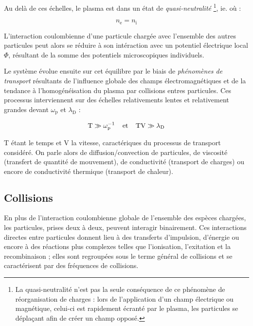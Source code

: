 \begin{refsection}
Au delà de ces échelles, le plasma est dans un état de \emph{quasi-neutralité}
\footnote{La quasi-neutralité n'est pas la seule conséquence de ce phénomène de réorganisation
de charges : lors de l'application d'un champ électrique ou magnétique, celui-ci est rapidement
écranté par le plasma, les particules se
déplaçant afin de créer un champ opposé.}, 
ie. où :

\begin{equation}
n_\text{e}=n_\text{i}
\label{quasineutralité}
\end{equation}

L'interaction coulombienne d'une particule chargée avec l'ensemble des autres particules peut alors
se réduire à son intéraction avec un potentiel électrique local $\Phi$,
résultant de la somme des potentiels microscopiques individuels.

Le système évolue ensuite sur cet équilibre par le biais de
\emph{phénomènes de transport} résultants de l'influence
globale des champs électromagnétiques et de la tendance à
l'homogénéisation du plasma par collisions entres particules.
Ces processus interviennent sur des échelles relativements
lentes et relativement grandes devant $\omega_\text{p}$ et $\lambda_\text{D}$ :

\begin{equation}
\text{T}\gg \omega_\text{p}^{{-1}}
\;\;\;\;\text{et}\;\;\;\;\text{TV}\gg\lambda_\text{D}
\end{equation}

$\text{T}$ étant le temps et $\text{V} $ la vitesse, caractériques du processus
de transport considéré.
On parle alors de diffusion/convection de particules, de viscosité (transfert de
quantité de mouvement), de conductivité (transport de charges) ou encore de
conductivité thermique (transport de chaleur).

\subsection{Collisions}
En plus de l'interaction coulombienne globale de l'ensemble des espèces chargées, 
les particules, prises deux à deux, peuvent interagir binairement. 
Ces interactions directes entre particules donnent lieu à des transferts
d'impulsion, d'énergie ou encore à des réactions plus complexes telles que
l'ionisation, l'exitation et la recombinaison ; elles sont regroupées
sous le terme général de collisions et se caractérisent par des fréquences de
collisions.


\end{refsection}
